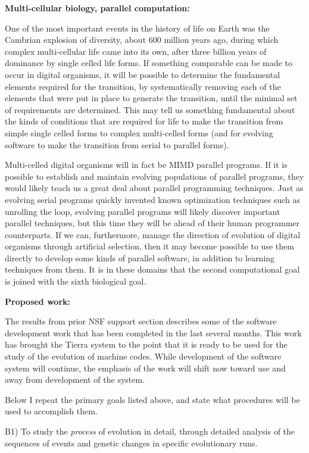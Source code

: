 {\bf Multi-cellular biology, parallel computation:}

One of the most important events in the history of life on Earth was the
Cambrian explosion of diversity, about 600 million years ago, during which
complex multi-cellular life came into its own, after three billion years of
dominance by single celled life forms.  If something comparable can be made
to occur in digital organisms, it will be possible to determine the fundamental
elements required for the transition, by systematically removing each of the
elements that were put in place to generate the transition, until the minimal
set of requirements are determined.  This may tell us something fundamental
about the kinds of conditions that are required for life to make the
transition from simple single celled forms to complex multi-celled forms
(and for evolving software to make the transition from serial to parallel
forms).

Multi-celled digital organisms will in fact be MIMD parallel programs.
If it is possible to establish and maintain evolving populations of parallel
programs, they would likely teach us a great deal about parallel programming
techniques.  Just as evolving serial programs quickly invented known
optimization techniques such as unrolling the loop, evolving parallel
programs will likely discover important parallel techniques, but this time
they will be ahead of their human programmer counterparts.  If we can,
furthermore, manage the direction of evolution of digital organisms through
artificial selection, then it may become possible to use them directly to
develop some kinds of parallel software, in addition to learning techniques
from them.  It is in these domains that the second computational goal is
joined with the sixth biological goal.

\LP
{\bf Proposed work:}
\eLP

The results from prior NSF support section describes some of the software
development work that has been completed in the last several months.  This
work has brought the Tierra system to the point that it is ready to be used
for the study of the evolution of machine codes.  While development of the
software system will continue, the emphasis of the work will shift now toward
use and away from development of the system.

Below I repeat the primary goals listed above, and state what procedures will
be used to accomplish them.

\XP
B1) To study the {\it process} of evolution in detail, through detailed
analysis of the sequences of events and genetic changes in specific
evolutionary runs.
\eXP

